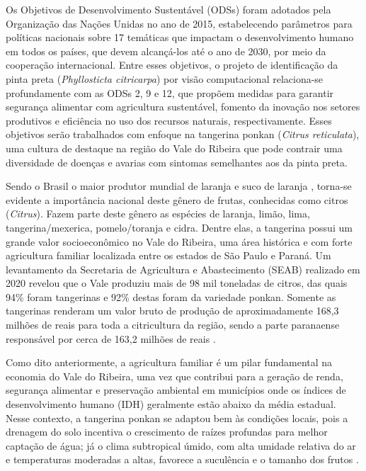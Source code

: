 Os Objetivos de Desenvolvimento Sustentável (ODSs) foram adotados pela Organização das Nações Unidas \cite{ONU2025} no ano de 2015, estabelecendo parâmetros para políticas nacionais sobre 17 temáticas que impactam o desenvolvimento humano em todos os países, que devem alcançá-los até o ano de 2030, por meio da cooperação internacional. Entre esses objetivos, o projeto de identificação da pinta preta (\emph{Phyllosticta citricarpa}) por visão computacional relaciona-se profundamente com as ODSs 2, 9 e 12, que propõem medidas para garantir segurança alimentar com agricultura sustentável, fomento da inovação nos setores produtivos e eficiência no uso dos recursos naturais, respectivamente. Esses objetivos serão trabalhados com enfoque na tangerina ponkan (\emph{Citrus reticulata}), uma cultura de destaque na região do Vale do Ribeira que pode contrair uma diversidade de doenças e avarias com sintomas semelhantes aos da pinta preta.

Sendo o Brasil o maior produtor mundial de laranja e suco de laranja \cite{USDA2025}, torna-se evidente a importância nacional deste gênero de frutas, conhecidas como citros (\emph{Citrus}). Fazem parte deste gênero as espécies de laranja, limão, lima, tangerina/mexerica, pomelo/toranja e cidra. Dentre elas, a tangerina possui um grande valor socioeconômico no Vale do Ribeira, uma área histórica e com forte agricultura familiar localizada entre os estados de São Paulo e Paraná. Um levantamento da Secretaria de Agricultura e Abastecimento (SEAB) realizado em 2020 revelou que o Vale produziu mais de 98 mil toneladas de citros, das quais 94\% foram tangerinas e 92\% destas foram da variedade ponkan. Somente as tangerinas renderam um valor bruto de produção de aproximadamente 168,3 milhões de reais para toda a citricultura da região, sendo a parte paranaense responsável por cerca de 163,2 milhões de reais \cite{Parana2021}.

Como dito anteriormente, a agricultura familiar é um pilar fundamental na economia do Vale do Ribeira, uma vez que contribui para a geração de renda, segurança alimentar e preservação ambiental em municípios onde os índices de desenvolvimento humano (IDH) geralmente estão abaixo da média estadual. Nesse contexto, a tangerina ponkan se adaptou bem às condições locais, pois a drenagem do solo incentiva o crescimento de raízes profundas para melhor captação de água; já o clima subtropical úmido, com alta umidade relativa do ar e temperaturas moderadas a altas, favorece a suculência e o tamanho dos frutos \cite{Borges2021}.

